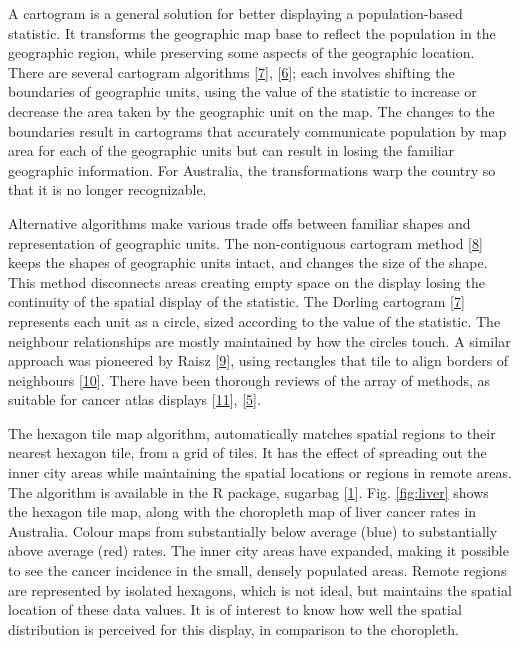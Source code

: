\documentclass[conference,final,]{IEEEtran}
\begin{document}
A cartogram is a general solution for better displaying a population-based statistic. It transforms the geographic map base to reflect the population in the geographic region, while preserving some aspects of the geographic location. There are several cartogram algorithms {[}\protect\hyperlink{ref-ACTUC}{7}{]}, {[}\protect\hyperlink{ref-CBATCC}{6}{]}; each involves shifting the boundaries of geographic units, using the value of the statistic to increase or decrease the area taken by the geographic unit on the map. The changes to the boundaries result in cartograms that accurately communicate population by map area for each of the geographic units but can result in losing the familiar geographic information. For Australia, the transformations warp the country so that it is no longer recognizable.

Alternative algorithms make various trade offs between familiar shapes and representation of geographic units. The non-contiguous cartogram method {[}\protect\hyperlink{ref-NAC}{8}{]} keeps the shapes of geographic units intact, and changes the size of the shape. This method disconnects areas creating empty space on the display losing the continuity of the spatial display of the statistic. The Dorling cartogram {[}\protect\hyperlink{ref-ACTUC}{7}{]} represents each unit as a circle, sized according to the value of the statistic. The neighbour relationships are mostly maintained by how the circles touch. A similar approach was pioneered by Raisz {[}\protect\hyperlink{ref-RSCW}{9}{]}, using rectangles that tile to align borders of neighbours {[}\protect\hyperlink{ref-CDWCS}{10}{]}. There have been thorough reviews of the array of methods, as suitable for cancer atlas displays {[}\protect\hyperlink{ref-review}{11}{]}, {[}\protect\hyperlink{ref-BCM}{5}{]}.

The hexagon tile map algorithm, automatically matches spatial regions to their nearest hexagon tile, from a grid of tiles. It has the effect of spreading out the inner city areas while maintaining the spatial locations or regions in remote areas. The algorithm is available in the R package, sugarbag {[}\protect\hyperlink{ref-sugarbag}{1}{]}. Fig. \ref{fig:liver} shows the hexagon tile map, along with the choropleth map of liver cancer rates in Australia. Colour maps from substantially below average (blue) to substantially above average (red) rates. The inner city areas have expanded, making it possible to see the cancer incidence in the small, densely populated areas. Remote regions are represented by isolated hexagons, which is not ideal, but maintains the spatial location of these data values. It is of interest to know how well the spatial distribution is perceived for this display, in comparison to the choropleth.
\end{document}
